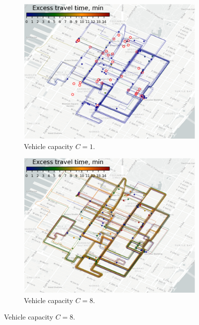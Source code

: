 \documentclass[12pt,notitlepage]{article}
\begin{document}
\begin{figure}[!p]
	\begin{subfigure}{0.5\textwidth}
		\includegraphics[width=\textwidth]{20210616-OPT1/c_grid_study0/UTC-20210619-074952/plots/8/excess_travel_time_traj}
		\caption{Vehicle capacity $C = 1$.}
	\end{subfigure}
	\begin{subfigure}{0.5\textwidth}
		\includegraphics[width=\textwidth]{20210616-OPT1/c_grid_study0/UTC-20210619-074952/plots/9/excess_travel_time_traj}
		\caption{Vehicle capacity $C = 8$.}
	\end{subfigure}
	

\end{figure}
\end{document}
